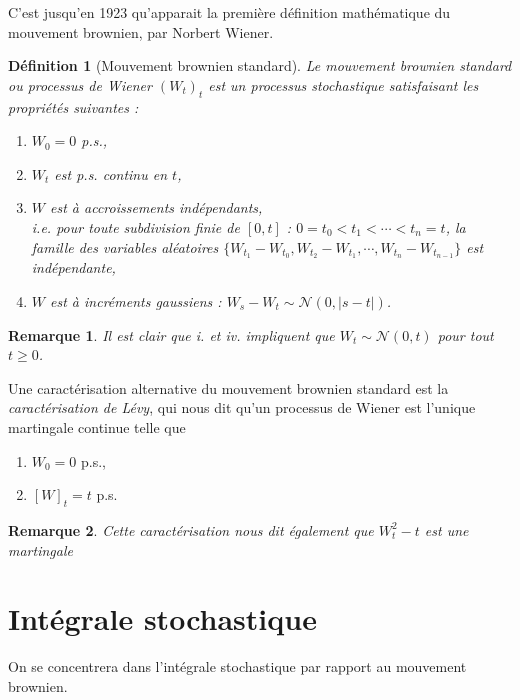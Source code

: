 \documentclass[openany]{book}
\newcommand{\1}{\mathbbm{1}}
\theoremstyle{thmfont}
\theoremstyle{deffont}
\newtheorem{definition}[definition]{Définition}
\theoremstyle{thmfont}
\theoremstyle{deffont}
\newtheorem*{remark}{Remarque}
\begin{document}
C'est jusqu'en 1923 qu'apparait la première définition mathématique du mouvement brownien, par Norbert Wiener.\\

\begin{definition}[Mouvement brownien standard]  \label{def:MvtBorwnien}
  Le \textit{mouvement brownien standard} ou \textit{processus de Wiener} $(W_t)_t$ est un processus stochastique satisfaisant les propriétés suivantes :
  \begin{enumerate}
  \item $W_0 = 0$ p.s.,
  \item $W_t$ est p.s. continu en $t$,
  \item $W$ est à accroissements indépendants,\\
    i.e. pour toute subdivision finie de $[0,t]$ :  $0 = t_0 < t_1 < \cdots < t_n = t$, la famille des variables aléatoires
    $\{W_{t_1} - W_{t_0}, W_{t_2} - W_{t_1}, \cdots ,W_{t_n} - W_{t_{n-1}}\}$
    est indépendante,
  \item $W$ est à incréments gaussiens : $W_s - W_t \sim \mathcal{N}(0,|s-t|)$.
  \end{enumerate}
\end{definition}

\begin{remark}
  Il est clair que \textit{i.} et \textit{iv.} impliquent que $W_t \sim \mathcal{N}(0,t)$ pour tout $t \geq 0$.
\end{remark}


Une caractérisation alternative du mouvement brownien standard est la \textit{caractérisation de Lévy}, qui nous dit qu'un processus de Wiener est l'unique martingale continue telle que
\begin{enumerate}
\item $W_0 = 0$ p.s.,
\item $[W]_t = t$ p.s.
  \label{def:MvtBorwnien_caractLevy}
\end{enumerate}

\begin{remark}
  Cette caractérisation nous dit également que $W_t^2 - t$ est une martingale
\end{remark}

\section{Intégrale stochastique}  

On se concentrera dans l'intégrale stochastique par rapport au mouvement brownien. 
\end{document}
